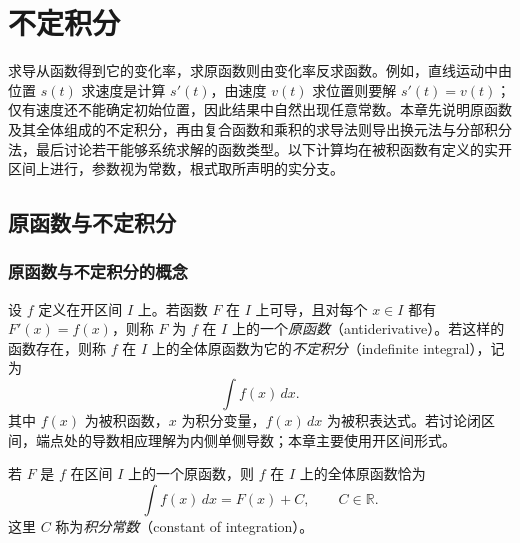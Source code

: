 \setcounter{chapter}{5} %
\chapter{不定积分}
\label{chap:indefinite-integrals}

求导从函数得到它的变化率，求原函数则由变化率反求函数。例如，直线运动中由位置 $s(t)$ 求速度是计算 $s'(t)$，由速度 $v(t)$ 求位置则要解 $s'(t)=v(t)$；仅有速度还不能确定初始位置，因此结果中自然出现任意常数。本章先说明原函数及其全体组成的不定积分，再由复合函数和乘积的求导法则导出换元法与分部积分法，最后讨论若干能够系统求解的函数类型。以下计算均在被积函数有定义的实开区间上进行，参数视为常数，根式取所声明的实分支。

\section{原函数与不定积分}
\label{sec:antiderivatives-and-indefinite-integrals}

\subsection{原函数与不定积分的概念}
\label{subsec:concepts-of-antiderivatives-and-indefinite-integrals}

\begin{definition}
\label{def:antiderivative-and-indefinite-integral}
设 $f$ 定义在开区间 $I$ 上。若函数 $F$ 在 $I$ 上可导，且对每个 $x\in I$ 都有 $F'(x)=f(x)$，则称 $F$ 为 $f$ 在 $I$ 上的一个\emph{原函数}（antiderivative）。若这样的函数存在，则称 $f$ 在 $I$ 上的全体原函数为它的\emph{不定积分}（indefinite integral），记为
\[
    \int f(x)\,dx.
\]
其中 $f(x)$ 为被积函数，$x$ 为积分变量，$f(x)\,dx$ 为被积表达式。若讨论闭区间，端点处的导数相应理解为内侧单侧导数；本章主要使用开区间形式。
\end{definition}

\begin{theorem}[原函数之间的关系]
\label{thm:antiderivatives-differ-by-constant}
若 $F$ 是 $f$ 在区间 $I$ 上的一个原函数，则 $f$ 在 $I$ 上的全体原函数恰为
\begin{equation}
    \int f(x)\,dx=F(x)+C,\qquad C\in\mathbb{R}.
    \label{eq:indefinite-integral-family}
\end{equation}
这里 $C$ 称为\emph{积分常数}（constant of integration）。
\end{theorem}

